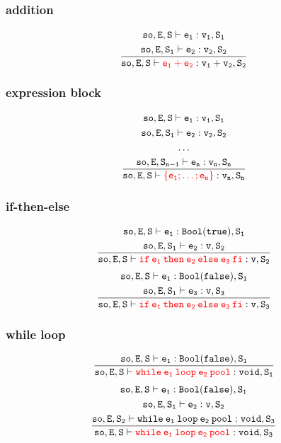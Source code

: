 \subsubsection{addition}
\begin{gather*}
\mathtt{so,E,S\vdash e_1:v_1,S_1}\\
\mathtt{\frac{so,E,S_1\vdash e_2:v_2,S_2}{so,E,S\vdash {\color{red}e_1+e_2}:v_1 + v_2,S_2}}
\end{gather*}
\subsubsection{expression block}
\begin{gather*}
\mathtt{so,E,S\vdash e_1:v_1,S_1}\\
\mathtt{so,E,S_1\vdash e_2:v_2,S_2}\\
\dots\\
\mathtt{\frac{so,E,S_{n-1}\vdash e_n:v_n,S_n}{so,E,S\vdash{\color{red}\{e_1;\dots;e_n\}}:v_n,S_n}}
\end{gather*}
\subsubsection{if-then-else}
\begin{gather*}
\mathtt{so,E,S\vdash e_1:Bool(true),S_1}\\
\mathtt{\frac{so,E,S_1\vdash e_2:v,S_2}{so,E,S\vdash{\color{red}if\:e_1\:then\:e_2\:else\:e_3\:fi}:v,S_2}}\\
\end{gather*}
\begin{gather*}
\mathtt{so,E,S\vdash e_1:Bool(false),S_1}\\
\mathtt{\frac{so,E,S_1\vdash e_3:v,S_3}{so,E,S\vdash{\color{red}if\:e_1\:then\:e_2\:else\:e_3\:fi}:v,S_3}}
\end{gather*}
\subsubsection{while loop}
\begin{gather*}
\mathtt{\frac{so,E,S\vdash e_1:Bool(false),S_1}{so,E,S\vdash{\color{red}while\:e_1\:loop\:e_2\:pool}:void,S_1}}
\end{gather*}
\begin{gather*}
\mathtt{so,E,S\vdash e_1:Bool(false),S_1}\\
\mathtt{so,E,S_1\vdash e_2:v,S_2}\\
\mathtt{\frac{so,E,S_2\vdash while\:e_1\:loop\:e_2\:pool:void,S_3}{so,E,S\vdash{\color{red}while\:e_1\:loop\:e_2\:pool}:void,S_3}}
\end{gather*}
